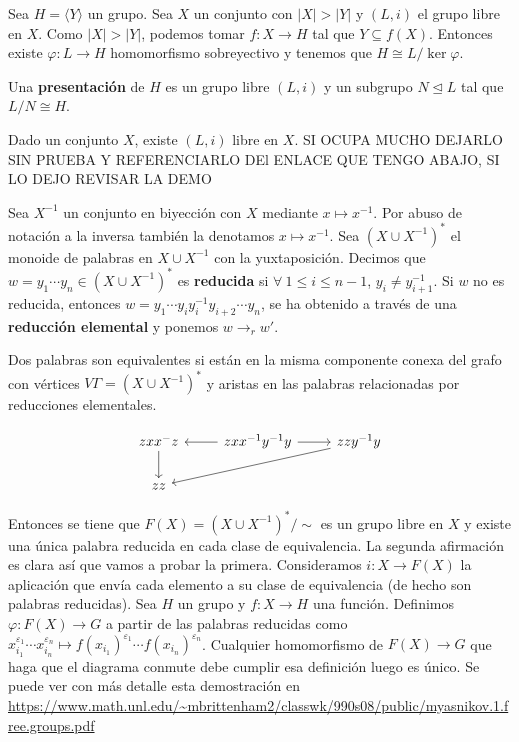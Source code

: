 \documentclass[bibtex, anon]{TEMat-article}
\providecommand{\gene}[1]{\langle{#1}\rangle}
\begin{document}
\begin{observacion}\label{4.2}
	Sea $H=\gene{Y}$ un grupo. Sea $X$ un conjunto con $|X|>|Y|$ y $(L,i)$ el grupo libre en $X$. Como $|X|>|Y|$, podemos tomar $f:X\to H$ tal que $Y\subseteq f(X)$. Entonces existe $\varphi:L\to H$ homomorfismo sobreyectivo y tenemos que $H\cong L/\ker\varphi$.
\end{observacion}

\begin{definicion}
	Una \textbf{presentación} de $H$ es un grupo libre $(L,i)$ y un subgrupo $N\trianglelefteq L$ tal que $L/N\cong H$. 
\end{definicion}

\begin{teorema}
	Dado un conjunto $X$, existe $(L,i)$ libre en $X$. SI OCUPA MUCHO DEJARLO SIN PRUEBA Y REFERENCIARLO DEl ENLACE QUE TENGO ABAJO, SI LO DEJO REVISAR LA DEMO
\end{teorema}
\begin{demostracion}
	Sea $X^{-1}$ un conjunto en biyección con $X$ mediante $x\mapsto x^{-1}$. Por abuso de notación a la inversa también la denotamos $x\mapsto x^{-1}$. Sea $(X\cup X^{-1})^*$ el monoide de palabras en $X\cup X^{-1}$ con la yuxtaposición. Decimos que $w=y_1\cdots y_n\in (X\cup X^{-1})^*$ es \textbf{reducida} si $\forall\ 1\leq i\leq n-1$, $y_i\neq y_{i+1}^{-1}$. Si $w$ no es reducida, entonces $w=y_1\cdots y_iy_i^{-1}y_{i+2}\cdots y_n$, se ha obtenido a través de una \textbf{reducción elemental} y ponemos $w\to_r w'$. 
	
	Dos palabras son equivalentes si están en la misma componente conexa del grafo con vértices $V\Gamma=(X\cup X^{-1})^*$ y aristas en las palabras relacionadas por reducciones elementales. 
	
	\[
	\begin{tikzcd}
	zxx^{-}z\arrow[d] & zxx^{-1}y^{-1}y\arrow[l]\arrow[r] &zzy^{-1}y\arrow[lld]\\
	zz 
	\end{tikzcd}
	\]
	
	Entonces se tiene que $F(X)=(X\cup X^{-1})^*/\sim$ es un grupo libre en $X$ y existe una única palabra reducida en cada clase de equivalencia. La segunda afirmación es clara así que vamos a probar la primera. Consideramos $i:X\to F(X)$ la aplicación que envía cada elemento a su clase de equivalencia (de hecho son palabras reducidas). Sea $H$ un grupo y $f:X\to H$ una función. Definimos $\varphi:F(X)\to G$ a partir de las palabras reducidas como $x_{i_1}^{\varepsilon_1}\cdots x_{i_n}^{\varepsilon_n}\mapsto f(x_{i_1})^{\varepsilon_1}\cdots f(x_{i_n})^{\varepsilon_n}$. Cualquier homomorfismo de $F(X)\to G$ que haga que el diagrama conmute debe cumplir esa definición luego es único. Se puede ver con más detalle esta demostración en \url{https://www.math.unl.edu/~mbrittenham2/classwk/990s08/public/myasnikov.1.free.groups.pdf}
	
\end{demostracion}
\end{document}
